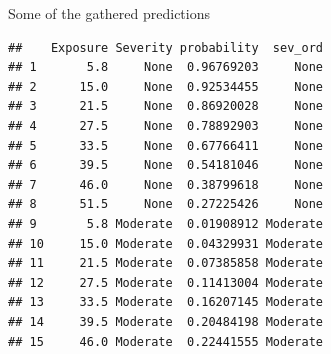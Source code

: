 \documentclass[ignorenonframetext,]{beamer}
\newenvironment{Shaded}{\begin{snugshade}}{\end{snugshade}}
\newcommand{\DecValTok}[1]{\textcolor[rgb]{0.00,0.00,0.81}{#1}}
\newcommand{\KeywordTok}[1]{\textcolor[rgb]{0.13,0.29,0.53}{\textbf{#1}}}
\newcommand{\NormalTok}[1]{#1}
\newcommand{\OperatorTok}[1]{\textcolor[rgb]{0.81,0.36,0.00}{\textbf{#1}}}
\newcommand{\StringTok}[1]{\textcolor[rgb]{0.31,0.60,0.02}{#1}}
\begin{document}
\begin{frame}[fragile]{Some of the gathered predictions}
\protect\hypertarget{some-of-the-gathered-predictions}{}

\footnotesize

\begin{Shaded}
\end{Shaded}

\begin{verbatim}
##    Exposure Severity probability  sev_ord
## 1       5.8     None  0.96769203     None
## 2      15.0     None  0.92534455     None
## 3      21.5     None  0.86920028     None
## 4      27.5     None  0.78892903     None
## 5      33.5     None  0.67766411     None
## 6      39.5     None  0.54181046     None
## 7      46.0     None  0.38799618     None
## 8      51.5     None  0.27225426     None
## 9       5.8 Moderate  0.01908912 Moderate
## 10     15.0 Moderate  0.04329931 Moderate
## 11     21.5 Moderate  0.07385858 Moderate
## 12     27.5 Moderate  0.11413004 Moderate
## 13     33.5 Moderate  0.16207145 Moderate
## 14     39.5 Moderate  0.20484198 Moderate
## 15     46.0 Moderate  0.22441555 Moderate
\end{verbatim}

\normalsize

\end{frame}
\end{document}
